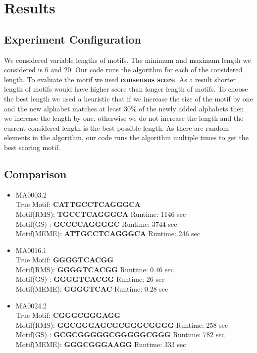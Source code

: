 \documentclass{article}
\begin{document}
\section{Results}

\subsection{Experiment Configuration}
We considered variable lengths of motifs. The minimum and maximum length we considered is 6 and 20. Our code runs the algorithm for each of the considered length. To evaluate the motif we used \textbf{consensus score}. As a result shorter length of motifs would have higher score than longer length of motifs. To choose the best length we used a heuristic that if we increase the size of the motif by one and the new alphabet matches at least $ 30\% $ of the newly added alphabets then we increase the length by one, otherwise we do not increase the length and the current considered length is the best possible length. As there are random elements in the algorithm, our code runs the algorithm multiple times to get the best scoring motif.

\subsection{Comparison}
\begin{itemize}
    \item MA0003.2\\
    True Motif: \textbf{\MakeUppercase{cattgcctcagggca}}\\
    Motif(RMS): \textbf{\MakeUppercase{tgcctcagggca}}   \quad Runtime: 1146 sec\\
    Motif(GS) : \textbf{\MakeUppercase{gccccaggggc}}    \quad Runtime: 3744 sec\\
    Motif(MEME): \textbf{ATTGCCTCAGGGCA}    \quad Runtime: 246 sec
    \item MA0016.1\\
    True Motif: \textbf{\MakeUppercase{ggggtcacgg}}\\
    Motif(RMS): \textbf{\MakeUppercase{ggggtcacgg}} \quad Runtime: 0.46 sec\\
    Motif(GS) : \textbf{\MakeUppercase{ggggtcacgg}} \quad Runtime: 26 sec\\
    Motif(MEME): \textbf{GGGGTCAC}  \quad Runtime: 0.28 sec\\
    \item MA0024.2\\
    True Motif: \textbf{\MakeUppercase{cgggcgggagg}}\\
    Motif(RMS): \textbf{\MakeUppercase{ggcgggagcgcgggcgggg}}   \quad Runtime: 258 sec\\
    Motif(GS) : \textbf{\MakeUppercase{gcgcgggggcgggggcggg}}    \quad Runtime: 782 sec\\
    Motif(MEME): \textbf{GGGCGGGAAGG}   \quad Runtime: 333 sec
\end{itemize}
\end{document}
